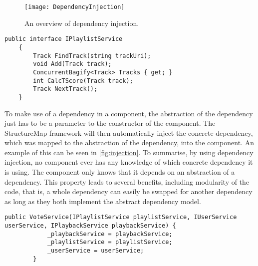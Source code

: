 \begin{figure}[hbtp]
  \centering
  \texttt{[image: DependencyInjection]}
  \caption{An overview of dependency injection.}\label{fig:dependencyInjection}
\end{figure}

\begin{lstlisting}[float, floatplacement=htpb,caption = {Abstraction of a dependency abstraction
    using C\# interfaces. A concrete dependency has to implement the
    methods described in the abstraction.}, label={fig:dep_abstraction}]
public interface IPlaylistService
    {
        Track FindTrack(string trackUri);
        void Add(Track track);
        ConcurrentBagify<Track> Tracks { get; }
        int CalcTScore(Track track);
        Track NextTrack();
    }
\end{lstlisting}

To make use of a dependency in a component, the abstraction of the
dependency just has to be a parameter to the constructor of the
component. The StructureMap framework will then automatically inject
the concrete dependency, which was mapped to the abstraction of the
dependency, into the component. An example of this can be seen in
\cref{fig:injection}. To summarise, by using dependency injection, no component ever
has any knowledge of which concrete dependency it is using. The
component only knows that it depends on an abstraction of a
dependency. This property leads to several benefits, including
modularity of the code, that is, a whole dependency can easily be swapped for
another dependency as long as they both implement the abstract
dependency model.

\begin{lstlisting}[float, floatplacement=htpb,caption = {Dependency Injection through class
    constructors. IPlaylistService, IUserService and IPlaybackService
    are all abstractions of dependencies.}, label={fig:injection}]
public VoteService(IPlaylistService playlistService, IUserService userService, IPlaybackService playbackService) {
            _playbackService = playbackService;
            _playlistService = playlistService;
            _userService = userService;
        }
\end{lstlisting}
